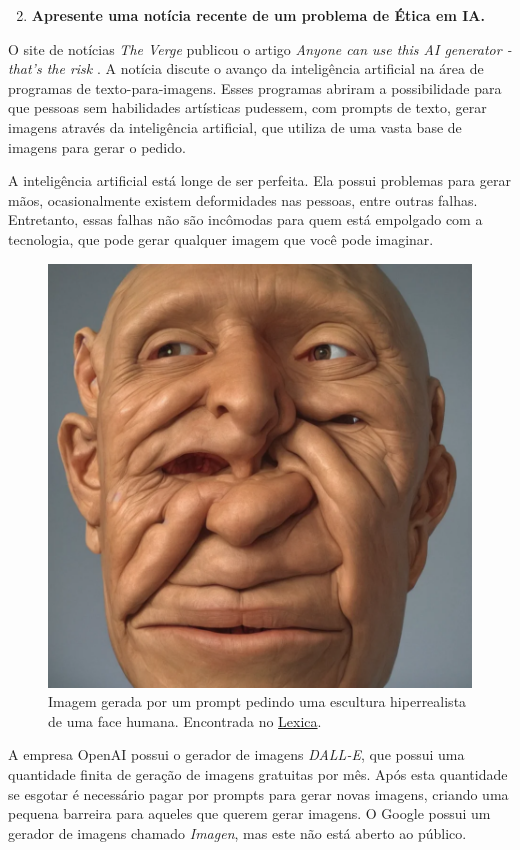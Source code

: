 \begin{enumerate}\setcounter{enumi}{1}\bfseries
    \item \textbf{Apresente uma notícia recente de um problema de Ética em IA.}
\end{enumerate}

O site de notícias \textit{The Verge} publicou o artigo \textit{Anyone can use this AI generator - that's the risk} \cite{verge_ai_generator}. A notícia discute o avanço da inteligência artificial na área de programas de texto-para-imagens. Esses programas abriram a possibilidade para que pessoas sem habilidades artísticas pudessem, com prompts de texto, gerar imagens através da inteligência artificial, que utiliza de uma vasta base de imagens para gerar o pedido.

A inteligência artificial está longe de ser perfeita. Ela possui problemas para gerar mãos, ocasionalmente existem deformidades nas pessoas, entre outras falhas. Entretanto, essas falhas não são incômodas para quem está empolgado com a tecnologia, que pode gerar qualquer imagem que você pode imaginar.

\begin{figure}[h]
\centering
\includegraphics[scale=0.15]{face_deformada.png}
\caption{Imagem gerada por um prompt pedindo uma escultura hiperrealista de uma face humana. Encontrada no \href{https://lexica.art/prompt/10023e09-97d2-4ba3-8e01-4ee149a42c6f}{Lexica}.}
\end{figure}


A empresa OpenAI possui o gerador de imagens \textit{DALL-E}, que possui uma quantidade finita de geração de imagens gratuitas por mês. Após esta quantidade se esgotar é necessário pagar por prompts para gerar novas imagens, criando uma pequena barreira para aqueles que querem gerar imagens. O Google possui um gerador de imagens chamado \textit{Imagen}, mas este não está aberto ao público.

